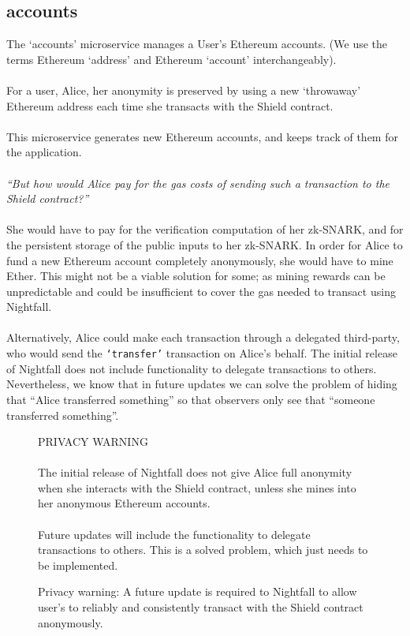 \subsection{accounts}
\label{sec:accounts}

The `accounts' microservice manages a User's Ethereum accounts. (We use the terms Ethereum `address' and Ethereum `account' interchangeably).\\
\\
For a user, Alice, her anonymity is preserved by using a new `throwaway' Ethereum address each time she transacts with the Shield contract.\\
\\
This microservice generates new Ethereum accounts, and keeps track of them for the application.\\
\\
\textit{``But how would Alice pay for the gas costs of sending such a transaction to the Shield contract?''}\\
\\
She would have to pay for the verification computation of her zk-SNARK, and for the persistent storage of the public inputs to her zk-SNARK. In order for Alice to fund a new Ethereum account completely anonymously, she would have to mine Ether. This might not be a viable solution for some; as mining rewards can be unpredictable and could be insufficient to cover the gas needed to transact using Nightfall.\\
\\
Alternatively, Alice could make each transaction through a delegated third-party, who would send the \texttt{`transfer'} transaction on Alice's behalf. The initial release of Nightfall does not include functionality to delegate transactions to others. Nevertheless, we know that in future updates we can solve the problem of hiding that ``Alice transferred something'' so that observers only see that ``someone transferred something''.

\begin{figure}[h]
  \begin{center}
    \begin{mdframed}[backgroundcolor=verylightred]
      \noindent
      PRIVACY WARNING\\
      \\
      The initial release of Nightfall does not give Alice full anonymity when she interacts with the Shield contract, unless she mines into her anonymous Ethereum accounts.\\
      \\
      Future updates will include the functionality to delegate transactions to others. This is a solved problem, which just needs to be implemented.
    \end{mdframed}
  \end{center}
  \caption{Privacy warning: A future update is required to Nightfall to allow user's to reliably and consistently transact with the Shield contract anonymously.}
\end{figure}

